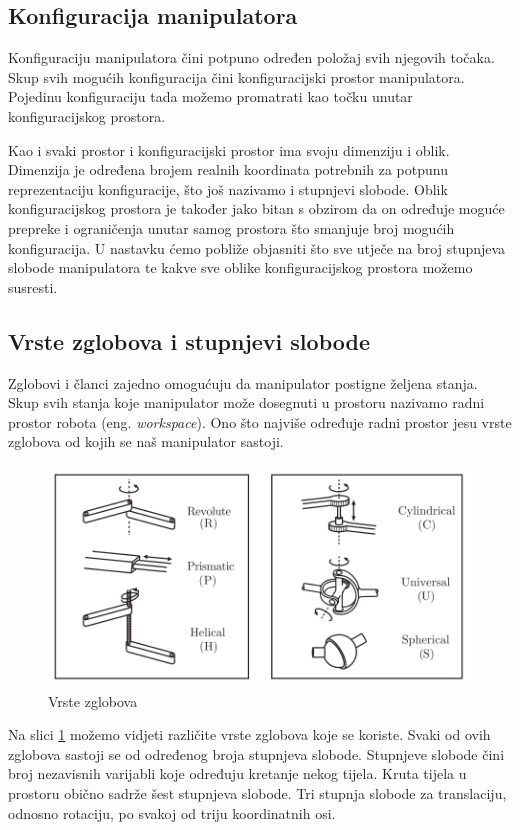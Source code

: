 \documentclass[times, utf8, diplomskirad]{fer}
\begin{document}
\subsection{Konfiguracija manipulatora}
Konfiguraciju manipulatora čini potpuno određen položaj svih njegovih točaka.
Skup svih mogućih konfiguracija čini konfiguracijski prostor manipulatora.
Pojedinu konfiguraciju tada možemo promatrati kao točku unutar konfiguracijskog prostora.

Kao i svaki prostor i konfiguracijski prostor ima svoju dimenziju i oblik.
Dimenzija je određena brojem realnih koordinata potrebnih za potpunu reprezentaciju konfiguracije, što još nazivamo i stupnjevi slobode.
Oblik konfiguracijskog prostora je također jako bitan s obzirom da on određuje moguće prepreke i ograničenja unutar samog prostora što smanjuje broj mogućih konfiguracija.
U nastavku ćemo pobliže objasniti što sve utječe na broj stupnjeva slobode manipulatora te kakve sve oblike konfiguracijskog prostora možemo susresti.

\hfill
\subsection{Vrste zglobova i stupnjevi slobode}
Zglobovi i članci zajedno omogućuju da manipulator postigne željena stanja.
Skup svih stanja koje manipulator može dosegnuti u prostoru nazivamo radni prostor robota (eng. \textit{workspace}).
Ono što najviše određuje radni prostor jesu vrste zglobova od kojih se naš manipulator sastoji.

\begin{figure}[H]
    \centering
    \includegraphics[width=12cm]{img/robot-joints}
    \caption{Vrste zglobova}
    \label{fig:robot-joints}
\end{figure}
Na slici \ref{fig:robot-joints} možemo vidjeti različite vrste zglobova koje se koriste.
Svaki od ovih zglobova sastoji se od određenog broja stupnjeva slobode.
Stupnjeve slobode čini broj nezavisnih varijabli koje određuju kretanje nekog tijela.
Kruta tijela u prostoru obično sadrže šest stupnjeva slobode.
Tri stupnja slobode za translaciju, odnosno rotaciju, po svakoj od triju koordinatnih osi.
\end{document}
